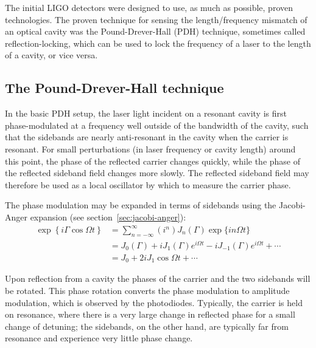 The initial LIGO detectors were designed to use, as much as possible,
proven technologies.  The proven technique for sensing the
length/frequency mismatch of an optical cavity was the
Pound-Drever-Hall (PDH)
technique\cite{Drever1983Laser,Black2001Introduction}, sometimes
called reflection-locking, which can be used to lock the frequency of
a laser to the length of a cavity, or vice versa.

\subsection{The Pound-Drever-Hall technique}
In the basic PDH setup, the laser light incident on a resonant cavity
is first phase-modulated at a frequency well outside of the bandwidth
of the cavity, such that the sidebands are nearly anti-resonant in the
cavity when the carrier is resonant.  For small perturbations (in
laser frequency or cavity length) around this point, the phase of the
reflected carrier changes quickly, while the phase of the reflected
sideband field changes more slowly.  The reflected sideband field may
therefore be used as a local oscillator by which to measure the
carrier phase.

The phase modulation may be expanded in terms of sidebands using the
Jacobi-Anger expansion (see section~\ref{sec:jacobi-anger}):
%
\begin{align}
\exp\left\{i\Gamma\cos\Omega t\right\} 
  &= \sum_{n=-\infty}^{\infty} \left(i^n\right)  J_n(\Gamma) \exp\{i n \Omega t\} \\
  &= J_0(\Gamma) + i J_{1}(\Gamma) e^{i\Omega t} - i J_{-1}(\Gamma) e^{i \Omega t}+\cdots \\
  &= J_0 + 2 i J_{1} \cos \Omega t + \cdots
\end{align}

Upon reflection from a cavity the phases of the carrier and the two
sidebands will be rotated.  This phase rotation converts the phase
modulation to amplitude modulation, which is observed by the
photodiodes.  Typically, the carrier is held on resonance, where there
is a very large change in reflected phase for a small change of
detuning; the sidebands, on the other hand, are typically far from
resonance and experience very little phase change.

